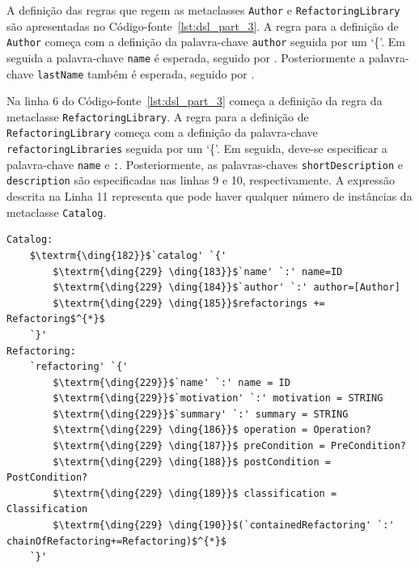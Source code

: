 A definição das regras que regem as metaclasses \texttt{Author} e \texttt{RefactoringLibrary} são apresentadas no Código-fonte~\ref{lst:dsl_part_3}. A regra para a definição de \texttt{Author} começa com a definição da palavra-chave \texttt{author} seguida por um `\{'. Em seguida a palavra-chave \texttt{name} é esperada, seguido por \aspas{\texttt{:}} . Posteriormente a palavra-chave \texttt{lastName} também é esperada, seguido por \aspas{\texttt{:}} . 

Na linha 6 do Código-fonte~\ref{lst:dsl_part_3} começa a definição da regra da metaclasse \texttt{RefactoringLibrary}. A regra para a definição de \texttt{RefactoringLibrary} começa com a definição da palavra-chave \texttt{refactoringLibraries} seguida por um `\{'. Em seguida, deve-se especificar a palavra-chave \texttt{name} e \texttt{:}. Posteriormente, as palavras-chaves \texttt{shortDescription} e \texttt{description} são especificadas nas linhas 9 e 10, respectivamente. A expressão descrita na Linha 11 representa que pode haver qualquer número de instâncias da metaclasse \texttt{Catalog}.

\begin{lstlisting}[language=Xtext, frame=single, basicstyle=\scriptsize, mathescape=true, label={lst:dsl_part_4}, caption={Gramática da DSL - parte 4}]
Catalog:
	$\textrm{\ding{182}}$`catalog' `{' 
		$\textrm{\ding{229} \ding{183}}$`name' `:' name=ID
		$\textrm{\ding{229} \ding{184}}$`author' `:' author=[Author]
		$\textrm{\ding{229} \ding{185}}$refactorings += Refactoring$^{*}$
	`}'
Refactoring:
	`refactoring' `{' 
		$\textrm{\ding{229}}$`name' `:' name = ID
		$\textrm{\ding{229}}$`motivation' `:' motivation = STRING
		$\textrm{\ding{229}}$`summary' `:' summary = STRING
		$\textrm{\ding{229} \ding{186}}$ operation = Operation?
		$\textrm{\ding{229} \ding{187}}$ preCondition = PreCondition?
		$\textrm{\ding{229} \ding{188}}$ postCondition = PostCondition?
		$\textrm{\ding{229} \ding{189}}$ classification = Classification
		$\textrm{\ding{229} \ding{190}}$(`containedRefactoring' `:' chainOfRefactoring+=Refactoring)$^{*}$
	`}'
\end{lstlisting}

